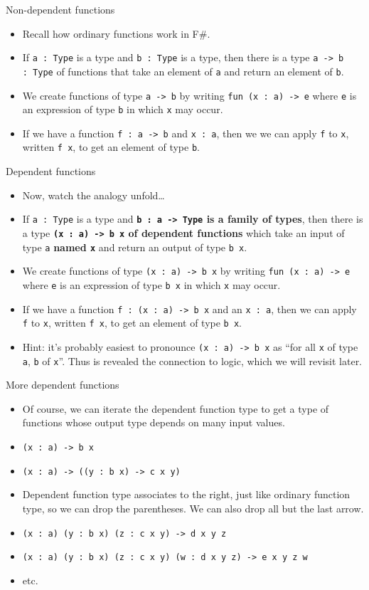 \documentclass{beamer}
\newcommand{\m}[1]{\texttt{#1}}
\begin{document}
\begin{frame}{Non-dependent functions}
\begin{itemize}
	\item Recall how ordinary functions work in F\#.
	\item If \m{a :\ Type} is a type and \m{b :\ Type} is a type, then there is a type \m{a -> b :\ Type} of functions that take an element of \m{a} and return an element of \m{b}.
	\item We create functions of type \m{a -> b} by writing \m{fun (x :\ a) -> e} where \m{e} is an expression of type \m{b} in which \m{x} may occur.
	\item If we have a function \m{f :\ a -> b} and \m{x :\ a}, then we we can apply \m{f} to \m{x}, written \m{f x}, to get an element of type \m{b}.
\end{itemize}
\end{frame}

\begin{frame}{Dependent functions}
\begin{itemize}
	\item Now, watch the analogy unfold\dots
	\item If \m{a :\ Type} is a type and \textbf{\m{b :\ a -> Type} is a family of types}, then there is a type \textbf{\m{(x :\ a) -> b x} of dependent functions} which take an input of type \m{a} \textbf{named \m{x}} and return an output of type \m{b x}.
	\item We create functions of type \m{(x :\ a) -> b x} by writing \m{fun (x :\ a) -> e} where \m{e} is an expression of type \m{b x} in which \m{x} may occur.
	\item If we have a function \m{f :\ (x :\ a) -> b x} and an \m{x :\ a}, then we can apply \m{f} to \m{x}, written \m{f x}, to get an element of type \m{b x}.
	\item Hint: it's probably easiest to pronounce \m{(x :\ a) -> b x} as ``for all \m{x} of type \m{a}, \m{b} of \m{x}''. Thus is revealed the connection to logic, which we will revisit later.
\end{itemize}
\end{frame}

\begin{frame}{More dependent functions}
\begin{itemize}
	\item Of course, we can iterate the dependent function type to get a type of functions whose output type depends on many input values.
	\item \m{(x :\ a) -> b x}
	\item \m{(x :\ a) -> ((y :\ b x) -> c x y)}
	\item Dependent function type associates to the right, just like ordinary function type, so we can drop the parentheses. We can also drop all but the last arrow.
	\item \m{(x :\ a) (y :\ b x) (z :\ c x y) -> d x y z}
	\item \m{(x :\ a) (y :\ b x) (z :\ c x y) (w : d x y z) -> e x y z w}
	\item etc.
\end{itemize}
\end{frame}
\end{document}

